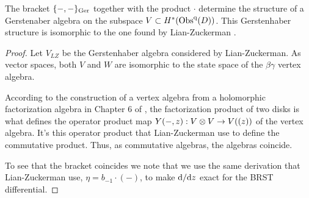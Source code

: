 \begin{prop} The bracket $\{-,-\}_{\rm Ger}$ together with the product $\cdot$ determine the structure of a Gerstenaber algebra on the subspace $V \subset H^*({\rm Obs}^{\rm q}(D))$. 
This Gerstenhaber structure is isomorphic to the one found by Lian-Zuckerman \cite{LZ1}.
\end{prop}
\begin{proof}
Let $V_{LZ}$ be the Gerstenhaber algebra considered by Lian-Zuckerman.
As vector spaces, both $V$ and $W$ are isomorphic to the state space of the $\beta\gamma$ vertex algebra.

According to the construction of a vertex algebra from a holomorphic factorization algebra in Chapter 6 of \cite{CG1}, the factorization product of two disks is what defines the operator product map $Y(-,z) : V \otimes V \to V ((z))$ of the vertex algebra.
It's this operator product that Lian-Zuckerman use to define the commutative product.
Thus, as commutative algebras, the algebras coincide. 

To see that the bracket coincides we note that we use the same derivation that Lian-Zuckerman use, $\eta = b_{-1} \cdot (-)$, to make ${\rm d} / {\rm d} z$ exact for the BRST differential.
\end{proof}

